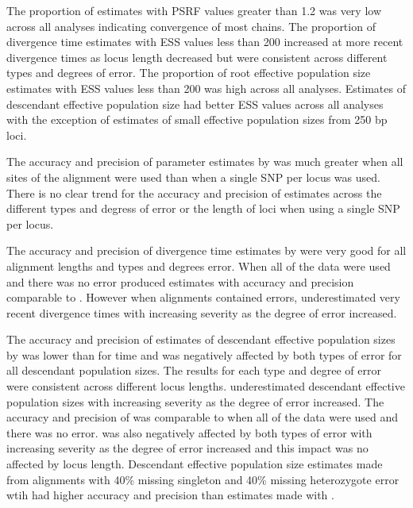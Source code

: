 The proportion of estimates with PSRF values greater than 1.2 was very low across 
all \beast analyses indicating convergence of most chains.
The proportion of \beast divergence time estimates with ESS values less than 200 
increased at more recent divergence times as locus length decreased but were 
consistent across different types and degrees of error.
The proportion of \beast root effective population size estimates with ESS 
values less than 200 was high across all analyses. 
Estimates of descendant effective population size had better ESS values across all 
analyses with the exception of estimates of small effective population sizes from 
250 bp loci.

The accuracy and precision of parameter estimates by \ecoevolity was much greater
when all sites of the alignment were used than when a single SNP per locus was used.  
There is no clear trend for the accuracy and precision of \ecoevolity estimates across the
different types and degress of error or the length of loci when using a single SNP per locus. 

The accuracy and precision of divergence time estimates by \beast were very good for all 
alignment lengths and types and degrees error. 
When all of the data were used and there was no error \ecoevolity produced 
estimates with accuracy and precision comparable to \beast. 
However when alignments contained errors, \ecoevolity underestimated very recent 
divergence times with increasing severity as the degree of error increased. 

The accuracy and precision of estimates of descendant effective population sizes 
by \beast was lower than for time and was negatively affected by both types
of error for all descendant population sizes.
The results for each type and degree of error were consistent across different 
locus lengths.
\beast underestimated descendant effective population sizes with increasing severity 
as the degree of error increased.
The accuracy and precision of \ecoevolity was comparable to \beast when all of 
the data were used and there was no error. \ecoevolity was also negatively affected
by both types of error with increasing severity as the degree of error increased
and this impact was no affected by locus length.
Descendant effective population size estimates made from alignments with 40\%
missing singleton and 40\% missing heterozygote error wtih \beast had higher
accuracy and precision than estimates made with \ecoevolity.   








